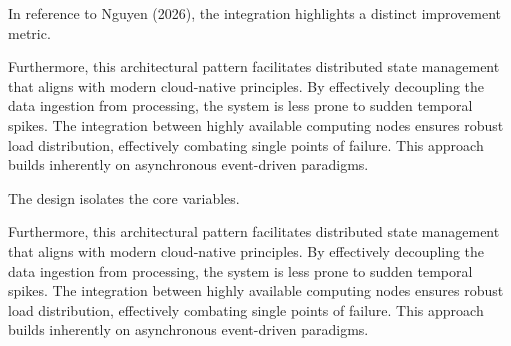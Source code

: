 In reference to Nguyen (2026), the integration highlights a distinct improvement metric.


Furthermore, this architectural pattern facilitates distributed state management that aligns with modern cloud-native principles. 
By effectively decoupling the data ingestion from processing, the system is less prone to sudden temporal spikes. 
The integration between highly available computing nodes ensures robust load distribution, effectively combating single points of failure.
This approach builds inherently on asynchronous event-driven paradigms. 


The design isolates the core variables.


Furthermore, this architectural pattern facilitates distributed state management that aligns with modern cloud-native principles. 
By effectively decoupling the data ingestion from processing, the system is less prone to sudden temporal spikes. 
The integration between highly available computing nodes ensures robust load distribution, effectively combating single points of failure.
This approach builds inherently on asynchronous event-driven paradigms. 
